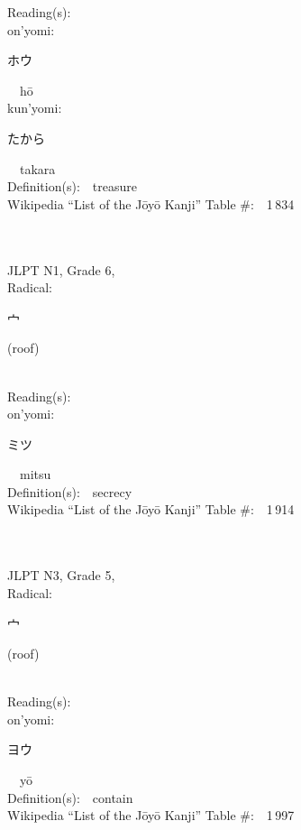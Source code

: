 \begin{multicols}{2}
Reading(s):\ \ \\
{\hspace*{1em}}on'yomi:\ \ \\
{\hspace*{2em}}{\begin{CJK}{UTF8}{min} ホウ \end{CJK}}\ \ h\=o\ \ \\
{\hspace*{1em}}kun'yomi:\ \ \\
{\hspace*{2em}}{\begin{CJK}{UTF8}{min} たから \end{CJK}}\ \ takara\ \ \\
Definition(s):\ \ treasure \\
Wikipedia ``List of the J\=oy\=o Kanji'' Table \#:\ \ 1\,834 \\
\ \ \\
{\fontsize{34pt}{40pt}  }\ \ \\  %
{JLPT N1, Grade 6, \\Radical:\ \ {\begin{CJK}{UTF8}{min} 宀 \end{CJK}} (roof) } \\
Reading(s):\ \ \\
{\hspace*{1em}}on'yomi:\ \ \\
{\hspace*{2em}}{\begin{CJK}{UTF8}{min} ミツ \end{CJK}}\ \ mitsu\ \ \\
Definition(s):\ \ secrecy \\
Wikipedia ``List of the J\=oy\=o Kanji'' Table \#:\ \ 1\,914 \\
\ \ \\
{\fontsize{34pt}{40pt}  }\ \ \\  %
{JLPT N3, Grade 5, \\Radical:\ \ {\begin{CJK}{UTF8}{min} 宀 \end{CJK}} (roof) } \\
Reading(s):\ \ \\
{\hspace*{1em}}on'yomi:\ \ \\
{\hspace*{2em}}{\begin{CJK}{UTF8}{min} ヨウ \end{CJK}}\ \ y\=o\ \ \\
Definition(s):\ \ contain \\
Wikipedia ``List of the J\=oy\=o Kanji'' Table \#:\ \ 1\,997 \\
\ \ \\
\end{multicols}


